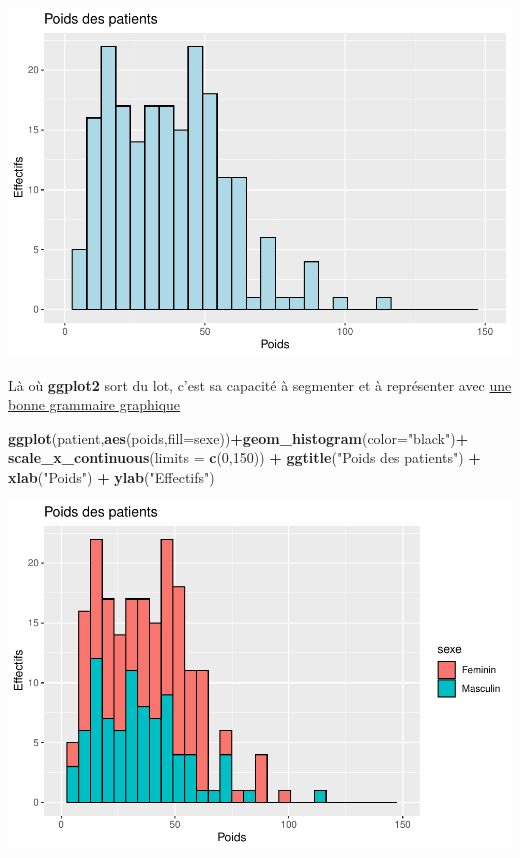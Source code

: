 \documentclass[
]{book}
\newenvironment{Shaded}{\begin{snugshade}}{\end{snugshade}}
\newcommand{\AttributeTok}[1]{\textcolor[rgb]{0.13,0.29,0.53}{#1}}
\newcommand{\DecValTok}[1]{\textcolor[rgb]{0.00,0.00,0.81}{#1}}
\newcommand{\FunctionTok}[1]{\textcolor[rgb]{0.13,0.29,0.53}{\textbf{#1}}}
\newcommand{\NormalTok}[1]{#1}
\newcommand{\SpecialCharTok}[1]{\textcolor[rgb]{0.81,0.36,0.00}{\textbf{#1}}}
\newcommand{\StringTok}[1]{\textcolor[rgb]{0.31,0.60,0.02}{#1}}
\begin{document}
\includegraphics{_main_files/figure-latex/ggplot7-1.pdf}

Là où \textbf{ggplot2} sort du lot, c'est sa capacité à segmenter et à représenter
avec \href{https://link.springer.com/book/10.1007/0-387-28695-0}{une bonne grammaire graphique}

\begin{Shaded}
\begin{Highlighting}[]
\FunctionTok{ggplot}\NormalTok{(patient,}\FunctionTok{aes}\NormalTok{(poids,}\AttributeTok{fill=}\NormalTok{sexe))}\SpecialCharTok{+}\FunctionTok{geom\_histogram}\NormalTok{(}\AttributeTok{color=}\StringTok{"black"}\NormalTok{)}\SpecialCharTok{+}
  \FunctionTok{scale\_x\_continuous}\NormalTok{(}\AttributeTok{limits =} \FunctionTok{c}\NormalTok{(}\DecValTok{0}\NormalTok{,}\DecValTok{150}\NormalTok{)) }\SpecialCharTok{+} 
  \FunctionTok{ggtitle}\NormalTok{(}\StringTok{"Poids des patients"}\NormalTok{) }\SpecialCharTok{+} 
  \FunctionTok{xlab}\NormalTok{(}\StringTok{"Poids"}\NormalTok{) }\SpecialCharTok{+} 
  \FunctionTok{ylab}\NormalTok{(}\StringTok{"Effectifs"}\NormalTok{)}
\end{Highlighting}
\end{Shaded}

\includegraphics{_main_files/figure-latex/ggplot8-1.pdf}
\end{document}
